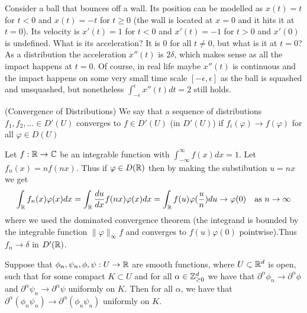 \documentclass[twoside, a4paper, 10pt]{amsart}
\begin{document}
\begin{eg} Consider a ball that bounces off a wall. Its position can be modelled as $x(t) = t$ for $t<0$ and $x(t) = -t$ for $t \geq 0$ (the wall is located at $x=0$ and it hits it at $t = 0$). Its velocity is $x'(t) = 1$ for $t<0$ and $x'(t) = -1$ for $t>0$ and $x'(0)$ is undefined. What is its acceleration? It is $0$ for all $t \neq 0$, but what is it at $t = 0$? As a distribution the acceleration $x''(t)$ is $2\delta$, which makes sense as all the impact happens at $t=0$. Of course, in real life maybe $x''(t)$ is continuous and the impact happens on some very small time scale $[-\epsilon, \epsilon]$ as the ball is squashed and unsquashed, but nonetheless $\int_{-\epsilon}^{\epsilon} x''(t) dt = 2$ still holds. 

\end{eg}

\begin{mydef}(Convergence of Distributions) We say that a sequence of distributions $f_1,f_2, \ldots \in D'(U)$ converges to $f \in D'(U)$ (in $D'(U)$) if $f_i(\varphi) \to f(\varphi)$ for all $\varphi \in D(U)$

\end{mydef}

\begin{eg} Let $f:\mathbb{R} \to \mathbb{C}$ be an integrable function with $\int_{-\infty}^{\infty} f(x) dx = 1$. Let $f_n(x) = n f(nx)$. Thus if $\varphi \in D(\mathbb{R})$ then by making the substibution $u = nx$ we get $$\int_{\mathbb{R}} f_n(x) \varphi(x) dx = \int_{\mathbb{R}} \frac{du}{dx} f(nx) \varphi(x) dx = \int_{\mathbb{R}} f(u) \varphi(\frac{u}{n}) du \to \varphi(0) \quad \text{as } n \to \infty$$ where we used the dominated convergence theorem (the integrand is bounded by the integrable function $\| \varphi \|_{\infty} f$ and converges to $f(u)\varphi(0)$ pointwise).Thus $f_n \to \delta$ in $D'(\mathbb{R})$.

\end{eg}

\begin{lemma} Suppose that $\phi_n, \psi_n, \phi, \psi:U \to \mathbb{R}$ are smooth functions, where $U \subset \mathbb{R}^d$ is open, such that for some compact $K \subset U$ and for all $\alpha \in \mathbb{Z}^d_{\geq 0}$ we have that $\partial^{\alpha} \phi_n \to \partial^{\alpha}\phi$ and $\partial^{\alpha} \psi_n \to \partial^{\alpha}\psi$ uniformly on $K$. Then for all $\alpha$, we have that $\partial^{\alpha} (\phi_n \psi_n) \to \partial^{\alpha} (\phi_n \psi_n)$ uniformly on $K$.

\end{lemma}
\end{document}
